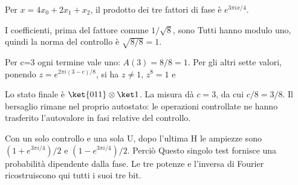 
Per \(x=4x_0+2x_1+x_2\), il prodotto dei tre fattori di fase è \(e^{3\pi ix/4}\).


I coefficienti, prima del fattore comune \(1/\sqrt8\), sono
Tutti hanno modulo uno, quindi la norma del controllo è \(\sqrt{8/8}=1\).


Per c=3 ogni termine vale uno: \(A(3)=8/8=1\). Per gli altri sette valori, ponendo \(z=e^{2\pi i(3-c)/8}\), si ha \(z\ne1\), \(z^8=1\) e


Lo stato finale è \(\ket{011}\otimes\ket1\). La misura dà \(c=3\), da cui \(c/8=3/8\). Il bersaglio rimane nel proprio autostato: le operazioni controllate ne hanno trasferito l’autovalore in fasi relative del controllo.


Con un solo controllo e una sola U, dopo l’ultima H le ampiezze sono \((1+e^{3\pi i/4})/2\) e \((1-e^{3\pi i/4})/2\). Perciò
Questo singolo test fornisce una probabilità dipendente dalla fase. Le tre potenze e l’inversa di Fourier ricostruiscono qui tutti i suoi tre bit.

